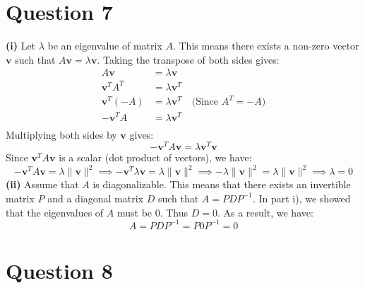 \documentclass{article}
\begin{document}
\newpage

\section*{Question 7}

\textbf{(i)} Let $\lambda$ be an eigenvalue of matrix $A$. This means there exists a non-zero vector $\mathbf{v}$ such that $A\mathbf{v} = \lambda \mathbf{v}$. Taking the transpose of both sides gives:
\[
\begin{aligned}
A\mathbf{v} &= \lambda \mathbf{v} \\
\mathbf{v}^T A^T &= \lambda \mathbf{v}^T \\
\mathbf{v}^T (-A) &= \lambda \mathbf{v}^T \quad \text{(Since } A^T = -A \text{)} \\
-\mathbf{v}^T A &= \lambda \mathbf{v}^T \\
\end{aligned}
\]
Multiplying both sides by $\mathbf{v}$ gives:
\[
-\mathbf{v}^T A \mathbf{v} = \lambda \mathbf{v}^T \mathbf{v}
\]
Since $\mathbf{v}^T A \mathbf{v}$ is a scalar (dot product of vectors), we have:
\[
-\mathbf{v}^T A \mathbf{v} = \lambda \|\mathbf{v}\|^2 \implies -\mathbf{v}^T \lambda \mathbf{v} = \lambda \|\mathbf{v}\|^2 \implies -\lambda \|\mathbf{v}\|^2= \lambda \|\mathbf{v}\|^2 \implies \lambda = 0
\]
\newline
\textbf{(ii)} Assume that $A$ is diagonalizable. This means that there exists an invertible matrix $P$ and a diagonal matrix $D$ such that $A = PDP^{-1}$. In part i), we showed that the eigenvalues of $A$ must be 0. Thus $D = 0$. As a result, we have:
$$A = PDP^{-1} = P0P^{-1} = 0$$


\newpage

\section*{Question 8}
\end{document}
